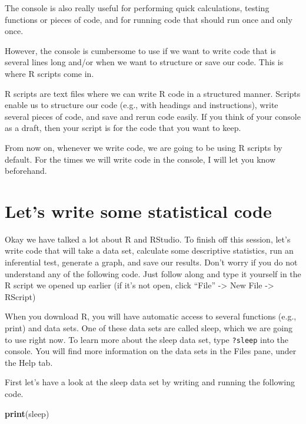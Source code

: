 \documentclass[
]{book}
\newenvironment{Shaded}{\begin{snugshade}}{\end{snugshade}}
\newcommand{\FunctionTok}[1]{\textcolor[rgb]{0.13,0.29,0.53}{\textbf{#1}}}
\newcommand{\NormalTok}[1]{#1}
\begin{document}
The console is also really useful for performing quick calculations, testing functions or pieces of code, and for running code that should run once and only once.

However, the console is cumbersome to use if we want to write code that is several lines long and/or when we want to structure or save our code. This is where R scripts come in.

R scripts are text files where we can write R code in a structured manner. Scripts enable us to structure our code (e.g., with headings and instructions), write several pieces of code, and save and rerun code easily. If you think of your console as a draft, then your script is for the code that you want to keep.

From now on, whenever we write code, we are going to be using R scripts by default. For the times we will write code in the console, I will let you know beforehand.

\hypertarget{lets-write-some-statistical-code}{%
\section{Let's write some statistical code}\label{lets-write-some-statistical-code}}

Okay we have talked a lot about R and RStudio. To finish off this session, let's write code that will take a data set, calculate some descriptive statistics, run an inferential test, generate a graph, and save our results. Don't worry if you do not understand any of the following code. Just follow along and type it yourself in the R script we opened up earlier (if it's not open, click ``File'' -\textgreater{} New File -\textgreater{} RScript)

When you download R, you will have automatic access to several functions (e.g., print) and data sets. One of these data sets are called sleep, which we are going to use right now. To learn more about the sleep data set, type \texttt{?sleep} into the console. You will find more information on the data sets in the Files pane, under the Help tab.

First let's have a look at the sleep data set by writing and running the following code.

\begin{Shaded}
\begin{Highlighting}[]
\FunctionTok{print}\NormalTok{(sleep) }
\end{Highlighting}
\end{Shaded}
\end{document}
